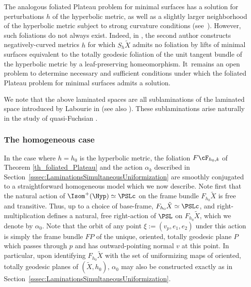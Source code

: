 \begin{remark}
The analogous foliated Plateau problem for minimal surfaces has a solution for perturbations $h$ of the hyperbolic metric, as well as a slightly larger neighborhood of the hyperbolic metric subject to strong curvature conditions (see~\hbox{\cite{Gromov_FolPlateau1,LoweGAFA}}). However, such foliations do not always exist. Indeed, in \cite{LoweGAFA}, the second author constructs negatively-curved metrics $h$ for which $S_h\tilde{X}$ admits no foliation by lifts of minimal surfaces equivalent to the totally geodesic foliation of the unit tangent bundle of the hyperbolic metric by a leaf-preserving homeomorphism. It~remains an open problem to determine necessary and sufficient conditions under which the foliated Plateau problem for minimal surfaces admits a solution.
\end{remark}

\begin{remark}We note that the above laminated spaces are all sublaminations of the laminated space introduced by Labourie in \cite{LabourieGAFA,LabourieInvent,LabourieAnnals} (see also \cite{Smith_asymp}). These sublaminations arise naturally in the study of quasi-Fuchsian \ksurfaces.
\end{remark}

\subsubsection{The homogeneous case}
In the case where $h=h_0$ is the hyperbolic metric, the foliation $F\cF_{h_0,k}$ of Theorem \ref{th_foliated_Plateau} and the action $\alpha_k$ described in Section~\ref{sssec:LaminationsSimultaneousUniformization} are smoothly conjugated to a straightforward homogeneous model which we now describe. Note first that the natural action of $\Isom^+(\Hyp)\simeq\PSLc$ on the frame bundle $F_{h_0}\tilde{X}$ is free and transitive. Thus, up to a choice of base-frame, $F_{h_0}\tilde{X}\simeq\PSLc$, and right-multiplication defines a natural, free right-action of $\PSL$ on $F_{h_0}\tilde{X}$, which we denote by $\alpha_0$. Note that the orbit of any point $\xi:=(v_p,e_1,e_2)$ under this action is simply the frame bundle $FP$ of the unique, oriented, totally geodesic plane $P$ which passes through $p$ and has outward-pointing normal $v$ at this point. In particular, upon identifying $F_{h_0}\tilde{X}$ with the set of uniformizing maps of oriented, totally geodesic planes of $(\tilde{X},h_0)$, $\alpha_0$ may also be constructed exactly as in Section~\ref{sssec:LaminationsSimultaneousUniformization}.

